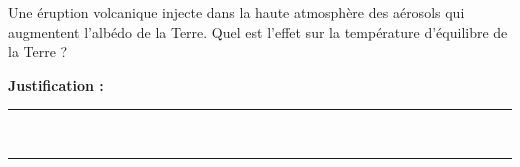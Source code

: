 Une éruption volcanique injecte dans la haute atmosphère des aérosols qui augmentent l'albédo de la Terre. Quel est l'effet sur la température d'équilibre de la Terre ?

\choices

\noindent\textbf{Justification :} \hrulefill \\[2.5ex]
\rule{\linewidth}{0.4pt} \\[2.5ex]
\rule{\linewidth}{0.4pt}
\vfill
